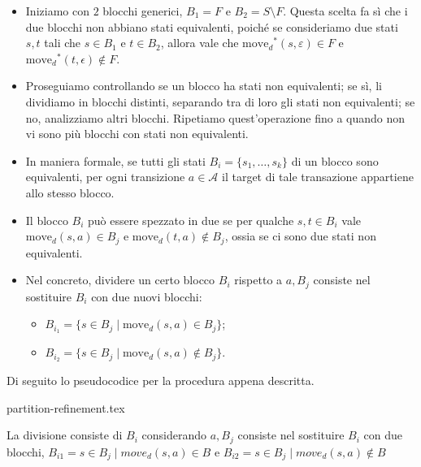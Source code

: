 \documentclass[class=book, crop=false, oneside, 12pt]{standalone}
\begin{document}
\begin{itemize}
    \item Iniziamo con \(2\) blocchi generici, \(B_{1}=F\) e \(B_{2}=S\setminus F\). Questa scelta fa sì che i due blocchi non abbiano stati equivalenti, poiché se consideriamo due stati \(s, t\) tali che \(s\in B_{1}\) e \(t\in B_{2}\), allora vale che \(\textrm{move}_{d}\!^{*}(s,\varepsilon)\in F\) e \(\textrm{move}_{d}\!^{*}(t,\epsilon)\notin F\).
    \item Proseguiamo controllando se un blocco ha stati non equivalenti; se sì, li dividiamo in blocchi distinti, separando tra di loro gli stati non equivalenti; se no, analizziamo altri blocchi. Ripetiamo quest'operazione fino a quando non vi sono più blocchi con stati non equivalenti.
    \item In maniera formale, se tutti gli stati \(B_{i}=\{s_{1}, \ldots, s_{k}\}\) di un blocco sono equivalenti, per ogni transizione \(a \in \mathcal{A}\) il target di tale transazione appartiene allo stesso blocco.
    \item Il blocco \(B_{i}\) può essere spezzato in due se per qualche \(s,t \in B_{i}\) vale \(\textrm{move}_{d}(s,a)\in B_{j}\) e \(\textrm{move}_{d}(t,a)\notin B_{j}\), ossia se ci sono due stati non equivalenti.
    \item Nel concreto, dividere un certo blocco \(B_{i}\) rispetto a \(a,B_{j}\) consiste nel sostituire \(B_{i}\) con due nuovi blocchi:
    \begin{itemize}
        \item \( B_{i_1} = \{s \in B_{j} \mid \textrm{move}_{d}(s,a)\in B_j\}\);
        \item \( B_{i_2} = \{s \in B_{j} \mid \textrm{move}_{d}(s,a)\notin B_j\}\).
    \end{itemize}
\end{itemize}
Di seguito lo pseudocodice per la procedura appena descritta.

{partition-refinement.tex}

La divisione consiste di \(B_{i}\) considerando \(a,B_{j}\) consiste nel sostituire \(B_{i}\) con due blocchi, \( B_{i1} = {s \in B_{j} \mid move_{d}(s,a)\in B}\) e \( B_{i2} = {s \in B_{j} \mid move_{d}(s,a)\notin B}\)
\end{document}
